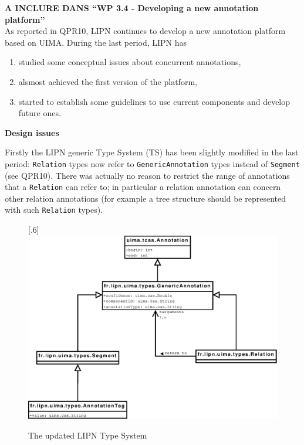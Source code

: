 \newcommand{\todo}[1]{{\bf [TODO #1]}}

{\bf A INCLURE DANS ``WP 3.4 - Developing a new annotation platform''}\\


As reported in QPR10, LIPN continues to develop a new annotation platform based on UIMA. During the last period, LIPN has
\begin{enumerate}
\item studied some conceptual issues about concurrent annotations,
\item alsmost achieved the first version of the platform,
\item started to establish some guidelines to use current components and develop future ones.
\end{enumerate}
\medskip

{\bf Design issues}
\medskip

Firstly the LIPN generic Type System (TS) has been slightly modified in the last period: {\tt Relation} types now refer to {\tt GenericAnnotation} types instead of {\tt Segment} (see QPR10). There was actually no reason to restrict the range of annotations that a {\tt Relation} can refer to; in particular a relation annotation can concern other relation annotations (for example a tree structure should be represented with such {\tt Relation} types).

\begin{figure}[htbp]
\begin{center}
\scalebox{.7}[.6]{\includegraphics{TS05.eps}}
\end{center}
\caption{The updated LIPN Type System \label{fig-LIPN-TS}}
\end{figure}


